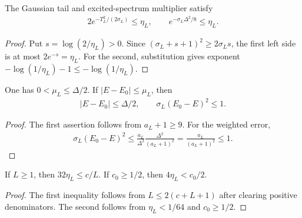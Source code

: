 \begin{lemma}
    \label{thm:huang_filter_scalar_errors}
    \leanok
    The Gaussian tail and excited-spectrum multiplier satisfy
    \begin{align}
        2e^{-T_L^2/(2\sigma_L)}\le\eta_L,\qquad
        e^{-\sigma_L\Delta^2/8}\le\eta_L.
    \end{align}
\end{lemma}
\begin{proof}
    \leanok
    Put $s=\log(2/\eta_L)>0$. Since
    $(\sigma_L+s+1)^2\ge2\sigma_Ls$, the first left side is at most
    $2e^{-s}=\eta_L$. For the second, substitution gives exponent
    $-\log(1/\eta_L)-1\le-\log(1/\eta_L)$.
\end{proof}

\begin{lemma}
    \label{thm:huang_energy_mesh_accuracy}
    \leanok
    One has $0<\mu_L\le\Delta/2$. If $|E-E_0|\le\mu_L$, then
    \begin{align}
        |E-E_0|\le\Delta/2,\qquad
        \sigma_L(E_0-E)^2\le1.
    \end{align}
\end{lemma}
\begin{proof}
    \leanok
    The first assertion follows from $a_L+1\ge9$. For the weighted error,
    \begin{align}
        \sigma_L(E_0-E)^2
        \le\frac{a_L}{\Delta^2}\frac{\Delta^2}{(a_L+1)^2}
        =\frac{a_L}{(a_L+1)^2}\le1.
    \end{align}
\end{proof}

\begin{lemma}
    \label{thm:huang_filter_precision_budgets}
    \leanok
    If $L\ge1$, then $32\eta_L\le c/L$. If $c_0\ge1/2$, then
    $4\eta_L<c_0/2$.
\end{lemma}
\begin{proof}
    \leanok
    The first inequality follows from $L\le2(c+L+1)$ after clearing positive
    denominators. The second follows from $\eta_L<1/64$ and $c_0\ge1/2$.
\end{proof}

